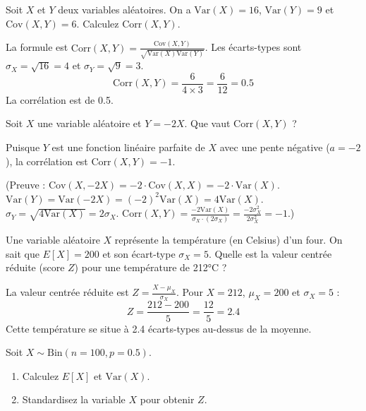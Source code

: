 \begin{exercicebox}[Corrélation - 1]
Soit $X$ et $Y$ deux variables aléatoires. On a $\text{Var}(X)=16$, $\text{Var}(Y)=9$ et $\text{Cov}(X,Y)=6$. Calculez $\text{Corr}(X,Y)$.
\end{exercicebox}

\begin{correctionbox}
La formule est $\text{Corr}(X,Y) = \frac{\text{Cov}(X,Y)}{\sqrt{\text{Var}(X)\text{Var}(Y)}}$.
Les écarts-types sont $\sigma_X = \sqrt{16} = 4$ et $\sigma_Y = \sqrt{9} = 3$.
$$\text{Corr}(X,Y) = \frac{6}{4 \times 3} = \frac{6}{12} = 0.5$$
La corrélation est de 0.5.
\end{correctionbox}

\begin{exercicebox}[Corrélation - 2]
Soit $X$ une variable aléatoire et $Y = -2X$. Que vaut $\text{Corr}(X,Y)$ ?
\end{exercicebox}

\begin{correctionbox}
Puisque $Y$ est une fonction linéaire parfaite de $X$ avec une pente négative ($a = -2$), la corrélation est $\text{Corr}(X,Y) = -1$.

(Preuve : $\text{Cov}(X, -2X) = -2 \cdot \text{Cov}(X,X) = -2 \cdot \text{Var}(X)$.
$\text{Var}(Y) = \text{Var}(-2X) = (-2)^2 \text{Var}(X) = 4 \text{Var}(X)$.
$\sigma_Y = \sqrt{4 \text{Var}(X)} = 2 \sigma_X$.
$\text{Corr}(X,Y) = \frac{-2 \text{Var}(X)}{\sigma_X \cdot (2 \sigma_X)} = \frac{-2 \sigma_X^2}{2 \sigma_X^2} = -1$.)
\end{correctionbox}

\begin{exercicebox}[Standardisation - 1]
Une variable aléatoire $X$ représente la température (en Celsius) d'un four. On sait que $E[X]=200$ et son écart-type $\sigma_X=5$. Quelle est la valeur centrée réduite (score $Z$) pour une température de 212°C ?
\end{exercicebox}

\begin{correctionbox}
La valeur centrée réduite est $Z = \frac{X - \mu_X}{\sigma_X}$.
Pour $X=212$, $\mu_X=200$ et $\sigma_X=5$ :
$$Z = \frac{212 - 200}{5} = \frac{12}{5} = 2.4$$
Cette température se situe à 2.4 écarts-types au-dessus de la moyenne.
\end{correctionbox}

\begin{exercicebox}[Standardisation - 2]
Soit $X \sim \text{Bin}(n=100, p=0.5)$.
\begin{enumerate}
    \item Calculez $E[X]$ et $\text{Var}(X)$.
    \item Standardisez la variable $X$ pour obtenir $Z$.
\end{enumerate}
\end{exercicebox}


